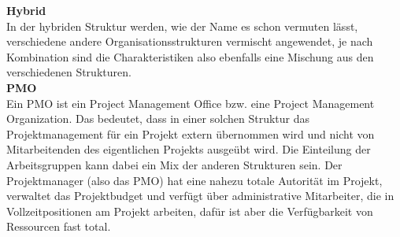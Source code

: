 \documentclass[ThesisDJ.tex]{subfiles}
\begin{document}
\textbf{Hybrid}\\
In der hybriden Struktur werden, wie der Name es schon vermuten lässt, verschiedene andere Organisationsstrukturen vermischt angewendet, je nach Kombination sind die Charakteristiken also ebenfalls eine Mischung aus den verschiedenen Strukturen.\medskip\\

\textbf{PMO}\\
Ein PMO ist ein Project Management Office bzw. eine Project Management Organization. Das bedeutet, dass in einer solchen Struktur das Projektmanagement für ein Projekt extern übernommen wird und nicht von Mitarbeitenden des eigentlichen Projekts ausgeübt wird. Die Einteilung der Arbeitsgruppen kann dabei ein Mix der anderen Strukturen sein. Der Projektmanager (also das PMO) hat eine nahezu totale Autorität im Projekt, verwaltet das Projektbudget und verfügt über administrative Mitarbeiter, die in Vollzeitpositionen am Projekt arbeiten, dafür ist aber die Verfügbarkeit von Ressourcen fast total.
\end{document}
